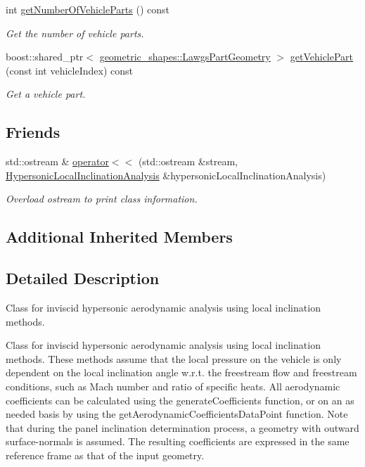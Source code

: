 \begin{DoxyCompactItemize}
int \hyperlink{classtudat_1_1aerodynamics_1_1HypersonicLocalInclinationAnalysis_ab8c49686ee6d71cffbe7d6cf80c5d507}{get\+Number\+Of\+Vehicle\+Parts} () const 
\begin{DoxyCompactList}\small\item\em Get the number of vehicle parts. \end{DoxyCompactList}\item 
boost\+::shared\+\_\+ptr$<$ \hyperlink{classtudat_1_1geometric__shapes_1_1LawgsPartGeometry}{geometric\+\_\+shapes\+::\+Lawgs\+Part\+Geometry} $>$ \hyperlink{classtudat_1_1aerodynamics_1_1HypersonicLocalInclinationAnalysis_ae27f7438e60d0e9d31a7b97435efdb32}{get\+Vehicle\+Part} (const int vehicle\+Index) const 
\begin{DoxyCompactList}\small\item\em Get a vehicle part. \end{DoxyCompactList}\end{DoxyCompactItemize}
\subsection*{Friends}
\begin{DoxyCompactItemize}
\item 
std\+::ostream \& \hyperlink{classtudat_1_1aerodynamics_1_1HypersonicLocalInclinationAnalysis_a087c421e8b4964b89a921caf810e6bfa}{operator$<$$<$} (std\+::ostream \&stream, \hyperlink{classtudat_1_1aerodynamics_1_1HypersonicLocalInclinationAnalysis}{Hypersonic\+Local\+Inclination\+Analysis} \&hypersonic\+Local\+Inclination\+Analysis)
\begin{DoxyCompactList}\small\item\em Overload ostream to print class information. \end{DoxyCompactList}\end{DoxyCompactItemize}
\subsection*{Additional Inherited Members}


\subsection{Detailed Description}
Class for inviscid hypersonic aerodynamic analysis using local inclination methods. 

Class for inviscid hypersonic aerodynamic analysis using local inclination methods. These methods assume that the local pressure on the vehicle is only dependent on the local inclination angle w.\+r.\+t. the freestream flow and freestream conditions, such as Mach number and ratio of specific heats. All aerodynamic coefficients can be calculated using the generate\+Coefficients function, or on an as needed basis by using the get\+Aerodynamic\+Coefficients\+Data\+Point function. Note that during the panel inclination determination process, a geometry with outward surface-\/normals is assumed. The resulting coefficients are expressed in the same reference frame as that of the input geometry. 

